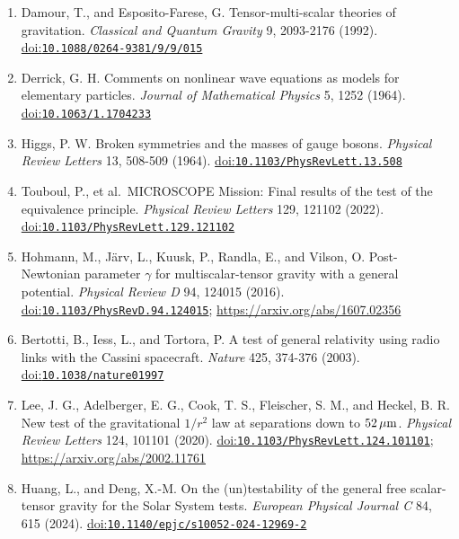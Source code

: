 \documentclass[
  american,
  11pt,
  letterpaper,
]{article}
\begin{document}
\begin{enumerate}
  Bekenstein, J. D. Fine-structure constant: Is it really a constant? \emph{Physical Review D} 25, 1527-1539 (1982). \href{https://doi.org/10.1103/PhysRevD.25.1527}{doi:\nolinkurl{10.1103/PhysRevD.25.1527}}
\item
  Damour, T., and Esposito-Farese, G. Tensor-multi-scalar theories of gravitation. \emph{Classical and Quantum Gravity} 9, 2093-2176 (1992). \href{https://doi.org/10.1088/0264-9381/9/9/015}{doi:\nolinkurl{10.1088/0264-9381/9/9/015}}
\item
  Derrick, G. H. Comments on nonlinear wave equations as models for elementary particles. \emph{Journal of Mathematical Physics} 5, 1252 (1964). \href{https://doi.org/10.1063/1.1704233}{doi:\nolinkurl{10.1063/1.1704233}}
\item
  Higgs, P. W. Broken symmetries and the masses of gauge bosons. \emph{Physical Review Letters} 13, 508-509 (1964). \href{https://doi.org/10.1103/PhysRevLett.13.508}{doi:\nolinkurl{10.1103/PhysRevLett.13.508}}
\item
  Touboul, P., et al.~MICROSCOPE Mission: Final results of the test of the equivalence principle. \emph{Physical Review Letters} 129, 121102 (2022). \href{https://doi.org/10.1103/PhysRevLett.129.121102}{doi:\nolinkurl{10.1103/PhysRevLett.129.121102}}
\item
  Hohmann, M., Järv, L., Kuusk, P., Randla, E., and Vilson, O. Post-Newtonian parameter \(\gamma\) for multiscalar-tensor gravity with a general potential. \emph{Physical Review D} 94, 124015 (2016). \href{https://doi.org/10.1103/PhysRevD.94.124015}{doi:\nolinkurl{10.1103/PhysRevD.94.124015}}; \url{https://arxiv.org/abs/1607.02356}
\item
  Bertotti, B., Iess, L., and Tortora, P. A test of general relativity using radio links with the Cassini spacecraft. \emph{Nature} 425, 374-376 (2003). \href{https://doi.org/10.1038/nature01997}{doi:\nolinkurl{10.1038/nature01997}}
\item
  Lee, J. G., Adelberger, E. G., Cook, T. S., Fleischer, S. M., and Heckel, B. R. New test of the gravitational \(1/r^2\) law at separations down to \(52\,\mu{\rm m}\). \emph{Physical Review Letters} 124, 101101 (2020). \href{https://doi.org/10.1103/PhysRevLett.124.101101}{doi:\nolinkurl{10.1103/PhysRevLett.124.101101}}; \url{https://arxiv.org/abs/2002.11761}
\item
  Huang, L., and Deng, X.-M. On the (un)testability of the general free scalar-tensor gravity for the Solar System tests. \emph{European Physical Journal C} 84, 615 (2024). \href{https://doi.org/10.1140/epjc/s10052-024-12969-2}{doi:\nolinkurl{10.1140/epjc/s10052-024-12969-2}}

\end{enumerate}
\end{document}
